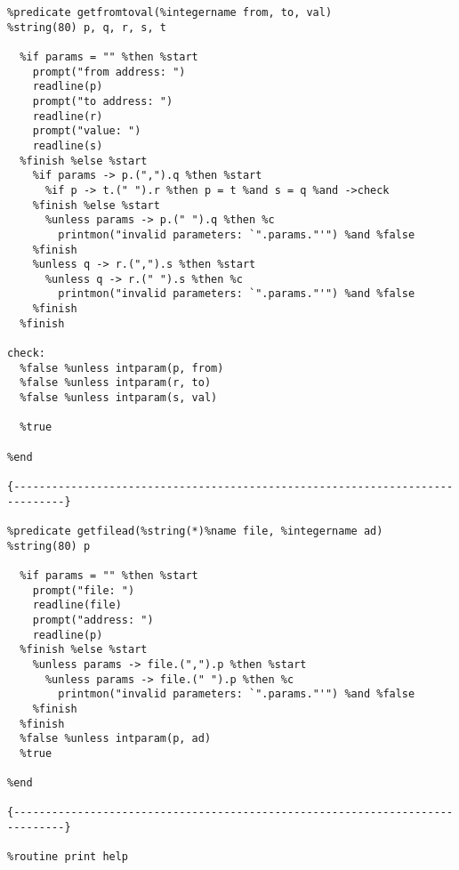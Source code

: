 \begin{verbatim}
%predicate getfromtoval(%integername from, to, val)
%string(80) p, q, r, s, t

  %if params = "" %then %start
    prompt("from address: ")
    readline(p)
    prompt("to address: ")
    readline(r)
    prompt("value: ")
    readline(s)
  %finish %else %start
    %if params -> p.(",").q %then %start
      %if p -> t.(" ").r %then p = t %and s = q %and ->check
    %finish %else %start
      %unless params -> p.(" ").q %then %c
        printmon("invalid parameters: `".params."'") %and %false
    %finish
    %unless q -> r.(",").s %then %start
      %unless q -> r.(" ").s %then %c
        printmon("invalid parameters: `".params."'") %and %false
    %finish
  %finish

check:
  %false %unless intparam(p, from)
  %false %unless intparam(r, to)
  %false %unless intparam(s, val)

  %true

%end

{------------------------------------------------------------------------------}

%predicate getfilead(%string(*)%name file, %integername ad)
%string(80) p

  %if params = "" %then %start
    prompt("file: ")
    readline(file)
    prompt("address: ")
    readline(p)
  %finish %else %start
    %unless params -> file.(",").p %then %start
      %unless params -> file.(" ").p %then %c
        printmon("invalid parameters: `".params."'") %and %false
    %finish
  %finish
  %false %unless intparam(p, ad)
  %true

%end

{------------------------------------------------------------------------------}

%routine print help


\end{verbatim}
